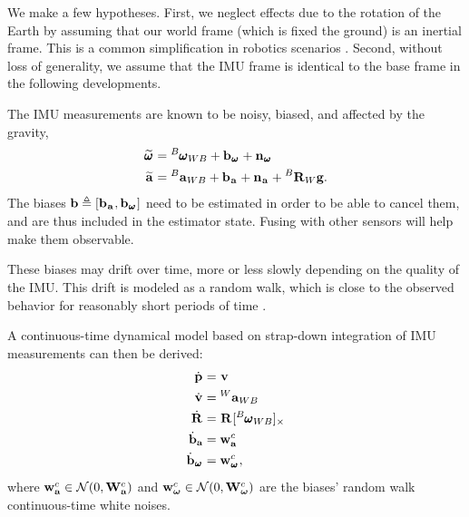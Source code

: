 We make a few hypotheses. First, we neglect effects due to the rotation of the Earth by assuming 
that our world frame (which is fixed \wrt the ground) is an inertial frame. This is a common simplification in robotics scenarios \cite{forster2017-TRO}. 
Second, without loss of generality, we assume that the IMU frame is identical to the base frame in the following developments.

The IMU measurements are known to be noisy, biased, and affected by the gravity,
%
\begin{equation}
    \begin{split}
    \prescript{}{}{\widetilde{\pmb{\omega}}}_{} &= \prescript{B}{}{\pmb{\omega}}_{WB} + {\bf b}_{\prescript{}{}{\pmb{\omega}}_{}} + {\bf n}_{\prescript{}{}{\pmb{\omega}}_{}} 
    \\
    \prescript{}{}{\widetilde{{\bf a}}}_{}    &= \prescript{B}{}{{\bf a}}_{WB} + {\bf b}_{\prescript{}{}{{\bf a}}_{}} + {\bf n}_{\prescript{}{}{{\bf a}}_{}} + \prescript{B}{}{{\bf R}}_{W} {\bf g} .
    \end{split}
    \label{eq:imu_meas_model}
\end{equation}
%    
The biases ${\bf b} \triangleq [{\bf b}_{\prescript{}{}{{\bf a}}_{}}, {\bf b}_{\prescript{}{}{\pmb{\omega}}_{}}]$ need to be estimated in order to be able to cancel them, and are thus included in the estimator state.
Fusing with other sensors will help make them observable.

These biases may drift over time, more or less slowly depending on the quality of the IMU. This drift is modeled 
as a random walk, which is close to the observed behavior for reasonably short periods of time \cite{hussen2015low}.

A continuous-time dynamical model  based on strap-down integration of IMU measurements can then be derived:
%
\begin{align}
\begin{split}
    \dot{\prescript{}{}{{\bf p}}_{}} &= \prescript{}{}{{\bf v}}_{} \\
    \dot{\prescript{}{}{{\bf v}}_{}} &= \prescript{W}{}{{\bf a}}_{WB} \\
    \dot{\prescript{}{}{{\bf R}}_{}} &= \prescript{}{}{{\bf R}}_{} [\prescript{B}{}{\pmb{\omega}}_{WB}]_{\times} \\
    \dot{{\bf b}}_{{\bf a}} &= {\bf w}_{{\bf a}}^c \\
    \dot{{\bf b}}_{\prescript{}{}{\pmb{\omega}}_{}} &= {\bf w}_{\prescript{}{}{\pmb{\omega}}_{}}^c ,
\end{split}
\label{eq:imu_dyn_conti}
\end{align}
%
where ${\bf w}_{{\bf a}}^c \in \mathcal{N}(0,{\bf W}_{\bf a}^c)$ and ${\bf w}_{{{\bm \omega}}}^c \in \mathcal{N}(0,{\bf W}_{{\bm \omega}}^c)$ are the biases' random walk continuous-time white noises.

